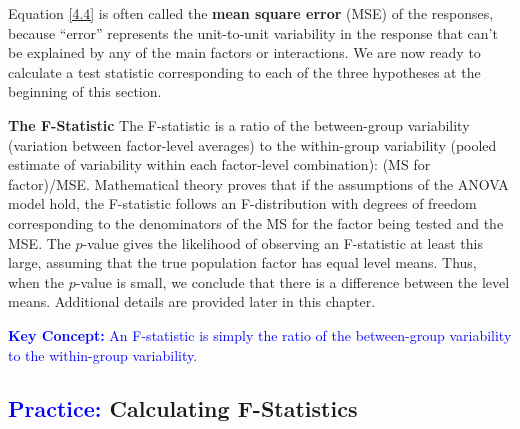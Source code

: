\documentclass[
]{report}
\begin{document}
Equation \ref{4.4} is often called the \textbf{mean square error} (MSE) of the responses, because ``error'' represents the unit-to-unit variability in the response that can't be explained by any of the main factors or interactions. We are now ready to calculate a test statistic corresponding to each of the three hypotheses at the beginning of this section.

\textbf{The F-Statistic} The F-statistic is a ratio of the between-group variability (variation between factor-level averages) to the within-group variability (pooled estimate of variability within each factor-level combination): (MS for factor)/MSE. Mathematical theory proves that if the assumptions of the ANOVA model hold, the F-statistic follows an F-distribution with degrees of freedom corresponding to the denominators of the MS for the factor being tested and the MSE. The \(\scriptstyle p\)-value gives the likelihood of observing an F-statistic at least this large, assuming that the true population factor has equal level means. Thus, when the \(\scriptstyle p\)-value is small, we conclude that there is a difference between the level means. Additional details are provided later in this chapter.

\textbf{\textcolor{blue}{Key Concept:}} \textcolor{blue}{An F-statistic is simply the ratio of the between-group variability to the within-group variability.}

\hypertarget{calculating-f-statistics}{%
\subsection*{\texorpdfstring{\textcolor{blue}{Practice:} Calculating F-Statistics}{ Calculating F-Statistics}}\label{calculating-f-statistics}}
\end{document}
